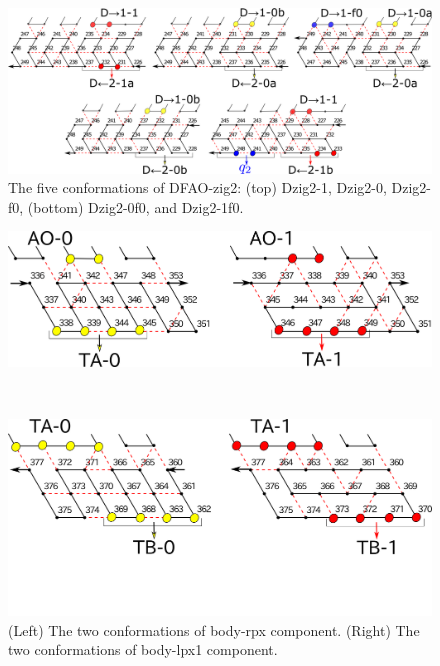 \documentclass[dvipdfmx,runningheads]{llncs}
\begin{document}
\begin{figure}[h]
\includegraphics[width=\linewidth]{pic/DFAO-zig2.png}
  \caption{The five conformations of DFAO-zig2: (top) Dzig2-1, Dzig2-0, Dzig2-f0, (bottom) Dzig2-0f0, and Dzig2-1f0. }
  \label{fig:DFAO-zig2}
\end{figure} 


\begin{figure}[h]
\centering
\begin{minipage}{0.45\linewidth}
\centering
\includegraphics[width=\linewidth]{pic/body-rpx1.png}
\end{minipage}
\begin{minipage}{0.05\linewidth}
\ \\
\end{minipage}
\begin{minipage}{0.45\linewidth}
\centering
\includegraphics[width=\linewidth]{pic/body-lpx1.png}
\end{minipage}
\caption{(Left) The two conformations of body-rpx component. 
(Right) The two conformations of body-lpx1 component.}
\label{fig:body-rpx}
\end{figure}
\end{document}
